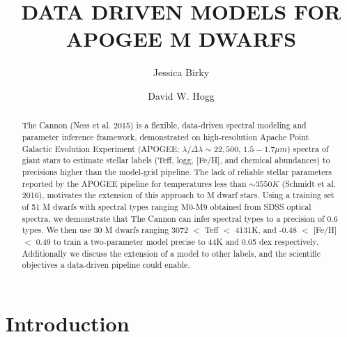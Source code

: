 \documentclass[onecolumn]{aastex62}
\begin{document}
\title{DATA DRIVEN MODELS FOR APOGEE M DWARFS}



\author[0000-0002-7961-6881]{Jessica Birky}

\author[0000-0003-2866-9403]{David W. Hogg}


\begin{abstract}

The Cannon (Ness et al. 2015) is a flexible, data-driven spectral modeling and parameter inference framework, demonstrated on high-resolution Apache Point Galactic Evolution Experiment (APOGEE; $\lambda/\Delta\lambda\sim22,500$, $1.5-1.7 \mu m$) spectra of giant stars to estimate stellar labels (Teff, logg, [Fe/H], and chemical abundances) to precisions higher than the model-grid pipeline. The lack of reliable stellar parameters reported by the APOGEE pipeline for temperatures less than $\sim3550K$ (Schmidt et al. 2016), motivates the extension of this approach to M dwarf stars. Using a training set of 51 M dwarfs with spectral types ranging M0-M9 obtained from SDSS optical spectra, we demonstrate that The Cannon can infer spectral types to a precision of 0.6 types. We then use 30 M dwarfs ranging 3072 $<$ Teff $<$ 4131K, and -0.48 $<$ [Fe/H] $<$ 0.49 to train a two-parameter model precise to 44K and 0.05 dex respectively. Additionally we discuss the extension of a model to other labels, and the scientific objectives a data-driven pipeline could enable.

\end{abstract}

 
\section{Introduction} \label{sec:intro}
\end{document}
